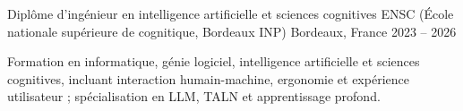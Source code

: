 
\begin{cventries}
  \cventry
    {Diplôme d’ingénieur en intelligence artificielle et sciences cognitives}
    {ENSC (École nationale supérieure de cognitique, Bordeaux INP)}
    {Bordeaux, France}
    {2023 -- 2026}
    {
      \begin{cvitems}
        \item {Formation en informatique, génie logiciel, intelligence artificielle et sciences cognitives, incluant interaction humain-machine, ergonomie et expérience utilisateur ; spécialisation en LLM, TALN et apprentissage profond.}
      \end{cvitems}
    }
\end{cventries}
